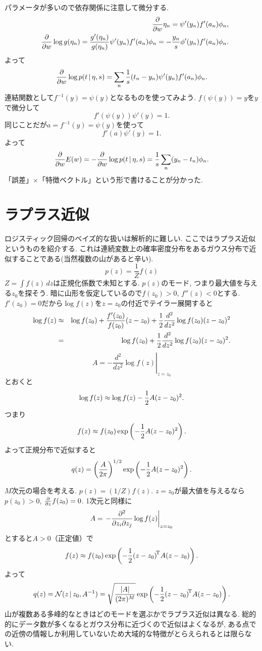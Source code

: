 パラメータが多いので依存関係に注意して微分する.
\begin{eqnarray*}&&
\frac{\partial}{\partial w}\eta_n=\psi'(y_n)f'(a_n)\phi_n,
\\&&
\frac{\partial}{\partial w}\log g(\eta_n)=\frac{g'(\eta_n)}{g(\eta_n)}\psi'(y_n)f'(a_n)\phi_n=-\frac{y_n}{s}\phi'(y_n)f'(a_n)\phi_n.
\end{eqnarray*}
よって
$$
\frac{\partial}{\partial w} \log p(t\,|\,\eta,s)=\sum_n \frac{1}{s}(t_n-y_n)\psi'(y_n)f'(a_n)\phi_n.
$$
連結関数として$f^{-1}(y)=\psi(y)$となるものを使ってみよう. $f(\psi(y))=y$を$y$で微分して
$$
f'(\psi(y))\psi'(y)=1.
$$
同じことだが$a=f^{-1}(y)=\psi(y)$を使って
$$
f'(a)\psi'(y)=1.
$$
よって
$$
\frac{\partial}{\partial w}E(w)=-\frac{\partial}{\partial w} \log p(t\,|\,\eta,s)=\frac{1}{s}\sum_n (y_n - t_n)\phi_n.
$$
「誤差」$\times$「特徴ベクトル」という形で書けることが分かった.

\section{ラプラス近似}
ロジスティック回帰のベイズ的な扱いは解析的に難しい.
ここではラプラス近似というものを紹介する. これは連続変数上の確率密度分布をあるガウス分布で近似することである(当然複数の山があると辛い).
$$
p(z)=\frac{1}{Z}f(z)
$$
$Z=\int f(z)\,dz$は正規化係数で未知とする. $p(z)$のモード, つまり最大値を与える$z_0$を探そう.
暗に山形を仮定しているので$f(z_0)>0$, $f''(z)<0$とする.
$f'(z_0)=0$だから$\log f(z)$を$z=z_0$の付近でテイラー展開すると
\begin{eqnarray*}
\log f(z) &\approx& \log f(z_0) + \frac{f'(z_0)}{f(z_0)}(z-z_0)+\frac{1}{2}\frac{d^2}{dz^2} \log f(z_0) (z-z_0)^2\\
 &=& \log f(z_0) + \frac{1}{2}\frac{d^2}{dz^2} \log f(z_0) (z-z_0)^2.
\end{eqnarray*}
$$
A=\left.-\frac{d^2}{dz^2}\log f(z) \right|_{z=z_0}
$$
とおくと
$$
\log f(z) \approx \log f(z) - \frac{1}{2} A(z-z_0)^2.
$$
つまり
$$
f(z) \approx f(z_0) \exp\left(-\frac{1}{2} A(z-z_0)^2\right).
$$
よって正規分布で近似すると
$$
q(z)=\left(\frac{A}{2\pi}\right)^{1/2} \exp\left(-\frac{1}{2} A(z-z_0)^2\right).
$$

$M$次元の場合を考える. $p(z)=(1/Z)f(z)$. $z=z_0$が最大値を与えるなら$p(z_0)>0$, $\frac{\partial}{\partial z}f(z_0)=0$.
1次元と同様に
$$
A=\left.-\frac{\partial^2}{\partial z_i \partial z_j} \log f(z) \right|_{z=z_0}
$$
とすると$A>0$（正定値）で
$$
f(z) \approx f(z_0) \exp\left(-\frac{1}{2}{(z-z_0)}^{\!\mathrm{T}}A(z-z_0)\right).
$$
よって
$$
q(z)={\cal N}(z\,|\,z_0,A^{-1})=\sqrt{\frac{|A|}{(2\pi)^M}} \exp\left(-\frac{1}{2}{(z-z_0)}^{\!\mathrm{T}}A(z-z_0)\right).
$$
山が複数ある多峰的なときはどのモードを選ぶかでラプラス近似は異なる.
総的的にデータ数が多くなるとガウス分布に近づくので近似はよくなるが, ある点での近傍の情報しか利用していないため大域的な特徴がとらえられるとは限らない.

